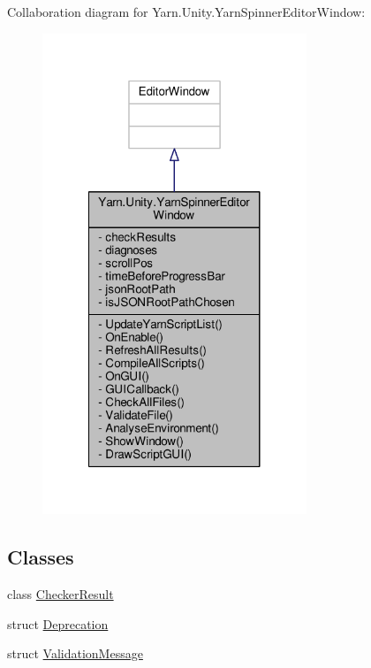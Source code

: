 Collaboration diagram for Yarn.\-Unity.\-Yarn\-Spinner\-Editor\-Window\-:
\nopagebreak
\begin{figure}[H]
\begin{center}
\leavevmode
\includegraphics[width=224pt]{a00796}
\end{center}
\end{figure}
\subsection*{Classes}
\begin{DoxyCompactItemize}
\item 
class \hyperlink{a00051}{Checker\-Result}
\item 
struct \hyperlink{a00092}{Deprecation}
\item 
struct \hyperlink{a00188_a00386}{Validation\-Message}
\end{DoxyCompactItemize}
